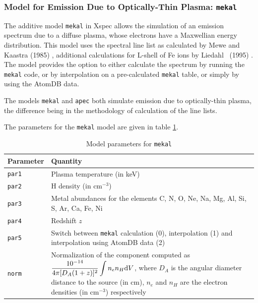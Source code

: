 			\subsubsection{Model for Emission Due to Optically-Thin Plasma: \texttt{mekal}}
				The additive model \texttt{mekal} in Xspec allows the simulation of an emission spectrum due to a diffuse plasma, whose electrons have a Maxwellian energy distribution. This model uses the spectral line list as calculated by Mewe and Kaastra (1985) \cite{meka}, additional calculations for L-shell of Fe ions by Liedahl \etal\ (1995) \cite{liedahl}. The model provides the option to either calculate the spectrum by running the \texttt{mekal} code, or by interpolation on a pre-calculated \texttt{mekal} table, or simply by using the AtomDB data.
				
				The models \texttt{mekal} and \texttt{apec} both simulate emission due to optically-thin plasma, the difference being in the methodology of calculation of the line lists.
				
				The parameters for the \texttt{mekal} model are given in table \ref{param:mekal}.
				\begin{table}[h!]
					\centering
					\caption{Model parameters for \texttt{mekal}}
					\label{param:mekal}
					\begin{tabular}{p{}p{}}
						\hline
						\textbf{Parameter} & \textbf{Quantity} \\ \hline
						{\texttt{par1}} & {Plasma temperature (in keV)} \\ %
						{\texttt{par2}} & {H density (in cm$^{-3}$)} \\ %
						{\texttt{par3}} & {Metal abundances for the elements C, N, O, Ne, Na, Mg, Al, Si, S, Ar, Ca, Fe, Ni} \\ %
						{\texttt{par4}} & {Redshift $z$} \\ %
						{\texttt{par5}} & {Switch between \texttt{mekal} calculation (0), interpolation (1) and interpolation using AtomDB data (2)} \\ %
						{\texttt{norm}} & {Normalization of the component computed as $\displaystyle\dfrac{10^{-14}}{4\pi[D_A(1+z)]^2}\int{n_en_H\mathrm{d}V}$, where $D_A$ is the angular diameter distance to the source (in cm), $n_e$ and $n_H$ are the electron densities (in cm$^{-3}$) respectively} \\ \hline
					\end{tabular}
				\end{table}
			
